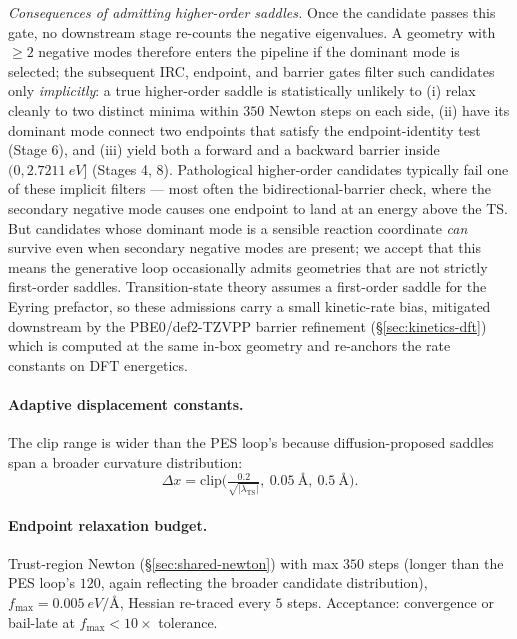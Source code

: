 \emph{Consequences of admitting higher-order saddles.} Once the candidate passes this gate, no downstream stage re-counts the negative eigenvalues. A geometry with $\geq 2$ negative modes therefore enters the pipeline if the dominant mode is selected; the subsequent IRC, endpoint, and barrier gates filter such candidates only \emph{implicitly}: a true higher-order saddle is statistically unlikely to (i) relax cleanly to two distinct minima within $350$ Newton steps on each side, (ii) have its dominant mode connect two endpoints that satisfy the endpoint-identity test (Stage 6), and (iii) yield both a forward and a backward barrier inside $(0, \SI{2.7211}{eV}]$ (Stages 4, 8). Pathological higher-order candidates typically fail one of these implicit filters --- most often the bidirectional-barrier check, where the secondary negative mode causes one endpoint to land at an energy above the TS. But candidates whose dominant mode is a sensible reaction coordinate \emph{can} survive even when secondary negative modes are present; we accept that this means the generative loop occasionally admits geometries that are not strictly first-order saddles. Transition-state theory assumes a first-order saddle for the Eyring prefactor, so these admissions carry a small kinetic-rate bias, mitigated downstream by the PBE0/def2-TZVPP barrier refinement (\S\ref{sec:kinetics-dft}) which is computed at the same in-box geometry and re-anchors the rate constants on DFT energetics.

\paragraph{Adaptive displacement constants.}
The clip range is wider than the PES loop's because diffusion-proposed saddles span a broader curvature distribution:
\begin{equation}
    \Delta x = \mathrm{clip}\bigl(\tfrac{0.2}{\sqrt{|\lambda_\text{TS}|}},\ \SI{0.05}{\angstrom},\ \SI{0.5}{\angstrom}\bigr).
\end{equation}

\paragraph{Endpoint relaxation budget.}
Trust-region Newton (\S\ref{sec:shared-newton}) with max $350$ steps (longer than the PES loop's $120$, again reflecting the broader candidate distribution), $f_\text{max} = \SI{0.005}{eV/\angstrom}$, Hessian re-traced every $5$ steps. Acceptance: convergence or bail-late at $f_\text{max} < 10\times$ tolerance.

